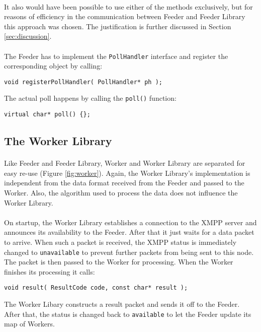 \paragraph{}
It also would have been possible to use either of the methods exclusively, but for reasons of efficiency in the communication between Feeder and Feeder Library this approach was chosen. The justification is further discussed in Section \ref{sec:discussion}.

\paragraph{}
The Feeder has to implement the \texttt{PollHandler} interface and register the corresponding object by calling:
\begin{flushleft}
\texttt{void registerPollHandler( PollHandler* ph );}
\end{flushleft}
The actual poll happens by calling the \texttt{poll()} function:
\begin{flushleft}
\texttt{virtual char* poll() \{\};}
\end{flushleft}


\subsection{The Worker Library}
\paragraph{}
Like Feeder and Feeder Library, Worker and Worker Library are separated for easy re-use (Figure \ref{fig:worker}). Again, the Worker Library's implementation is independent from the data format received from the Feeder and passed to the Worker. Also, the algorithm used to process the data does not influence the Worker Library.

\paragraph{}
On startup, the Worker Library establishes a connection to the XMPP server and announces its availability to the Feeder. After that it just waits for a data packet to arrive. When such a packet is received, the XMPP status is immediately changed to \texttt{unavailable} to prevent further packets from being sent to this node. The packet is then passed to the Worker for processing. When the Worker finishes its processing it calls:
\begin{flushleft}
\texttt{void result( ResultCode code, const char* result );}
\end{flushleft}
The Worker Libary constructs a result packet and sends it off to the Feeder. After that, the status is changed back to \texttt{available} to let the Feeder update its map of Workers.

